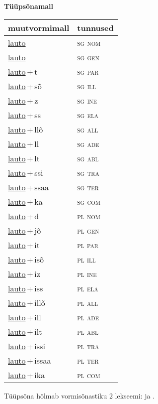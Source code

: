 
\vspace{1.8em}
\begin{minipage}{\textwidth}
\textbf{Tüüpsõnamall \,}\\

\begin{sideways}
\begin{tabular}{l l}
muutvormimall & tunnused \\
\hline
\underline{lauto} & \textsc{ sg nom } \\
\underline{lauto} & \textsc{ sg gen } \\
\underline{lauto}\,+\,t & \textsc{ sg par } \\
\underline{lauto}\,+\,sõ & \textsc{ sg ill } \\
\underline{lauto}\,+\,z & \textsc{ sg ine } \\
\underline{lauto}\,+\,ss & \textsc{ sg ela } \\
\underline{lauto}\,+\,llõ & \textsc{ sg all } \\
\underline{lauto}\,+\,ll & \textsc{ sg ade } \\
\underline{lauto}\,+\,lt & \textsc{ sg abl } \\
\underline{lauto}\,+\,ssi & \textsc{ sg tra } \\
\underline{lauto}\,+\,ssaa & \textsc{ sg ter } \\
\underline{lauto}\,+\,ka & \textsc{ sg com } \\
\underline{lauto}\,+\,d & \textsc{ pl nom } \\
\underline{lauto}\,+\,jõ & \textsc{ pl gen } \\
\underline{lauto}\,+\,it & \textsc{ pl par } \\
\underline{lauto}\,+\,isõ & \textsc{ pl ill } \\
\underline{lauto}\,+\,iz & \textsc{ pl ine } \\
\underline{lauto}\,+\,iss & \textsc{ pl ela } \\
\underline{lauto}\,+\,illõ & \textsc{ pl all } \\
\underline{lauto}\,+\,ill & \textsc{ pl ade } \\
\underline{lauto}\,+\,ilt & \textsc{ pl abl } \\
\underline{lauto}\,+\,issi & \textsc{ pl tra } \\
\underline{lauto}\,+\,issaa & \textsc{ pl ter } \\
\underline{lauto}\,+\,ika & \textsc{ pl com } \\
\end{tabular}
\end{sideways}
\label{tab:tüüpsõnamall-lauto}

\end{minipage}

 
\vspace{1em}
\noindent Tüüpsõna hõlmab vormisõnastiku 2 lekseemi:  ja .
